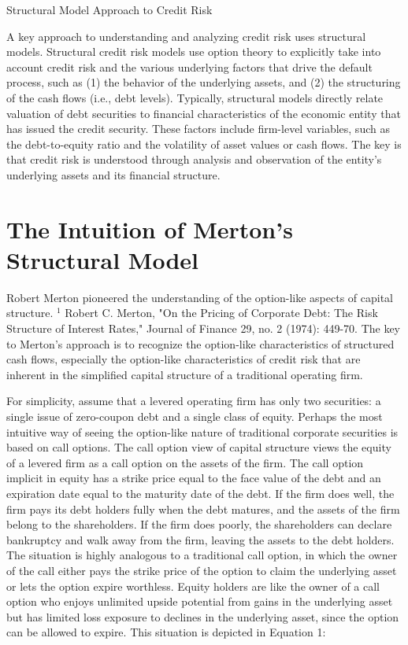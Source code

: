 \documentclass[11pt]{article}
\begin{document}
Structural Model Approach to Credit Risk

A key approach to understanding and analyzing credit risk uses structural models. Structural credit risk models use option theory to explicitly take into account credit risk and the various underlying factors that drive the default process, such as (1) the behavior of the underlying assets, and (2) the structuring of the cash flows (i.e., debt levels). Typically, structural models directly relate valuation of debt securities to financial characteristics of the economic entity that has issued the credit security. These factors include firm-level variables, such as the debt-to-equity ratio and the volatility of asset values or cash flows. The key is that credit risk is understood through analysis and observation of the entity's underlying assets and its financial structure.

\section*{The Intuition of Merton's Structural Model}
Robert Merton pioneered the understanding of the option-like aspects of capital structure. ${ }^{1}$ Robert C. Merton, "On the Pricing of Corporate Debt: The Risk Structure of Interest Rates," Journal of Finance 29, no. 2 (1974): 449-70. The key to Merton's approach is to recognize the option-like characteristics of structured cash flows, especially the option-like characteristics of credit risk that are inherent in the simplified capital structure of a traditional operating firm.

For simplicity, assume that a levered operating firm has only two securities: a single issue of zero-coupon debt and a single class of equity. Perhaps the most intuitive way of seeing the option-like nature of traditional corporate securities is based on call options. The call option view of capital structure views the equity of a levered firm as a call option on the assets of the firm. The call option implicit in equity has a strike price equal to the face value of the debt and an expiration date equal to the maturity date of the debt. If the firm does well, the firm pays its debt holders fully when the debt matures, and the assets of the firm belong to the shareholders. If the firm does poorly, the shareholders can declare bankruptcy and walk away from the firm, leaving the assets to the debt holders. The situation is highly analogous to a traditional call option, in which the owner of the call either pays the strike price of the option to claim the underlying asset or lets the option expire worthless. Equity holders are like the owner of a call option who enjoys unlimited upside potential from gains in the underlying asset but has limited loss exposure to declines in the underlying asset, since the option can be allowed to expire. This situation is depicted in Equation 1:
\end{document}
